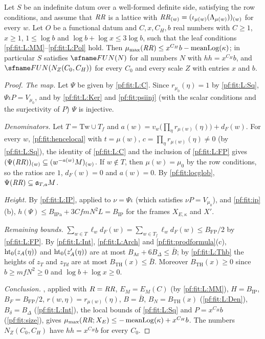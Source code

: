 \begin{theorem}\label{pf:fit:flb}
Let $S$ be an indefinite datum over a well-formed definite side, satisfying the row conditions, and assume that
$\mathit{RR}$ is a lattice with $\mathit{RR}_{(w)}=(\iota_{\mu(w)}(\Lambda_{\mu(w)}))_{(w)}$ for every $w$. Let $O$ be a
functional datum and $C,x,C_H,b$ real numbers with $C\ge1$, $x\ge1$, $1\le\log b$ and $\log b+\log x\le3\log b$, such
that the leaf conditions \ref{pf:fit:L:MM}--\ref{pf:fit:L:Pol} hold. Then $\mu_{\max}(\mathit{RR})\le x^{C_H}b-\operatorname{meanLog}(\kappa)$;
in particular $S$ satisfies $\fitFUN(N)$ for all numbers $N$ with $hh=x^{C_H}b$, and $\fitFUN(N_Z(C_0,C_H))$ for every
$C_0$ and every scale $Z$ with entries $x$ and $b$.
\end{theorem}

\begin{proof}
\emph{The map.} Let $\Psi$ be given by \ref{pf:fit:L:C}. Since $r_{\mu_0}(\eta)=1$ by \ref{pf:fit:L:Sq},
$\Psi\iota P=V_{\mu_0}$, and by \ref{pf:fit:L:Ker} and \cref{pf:fit:psiinj} (with the scalar conditions and the
surjectivity of $P$) $\Psi$ is injective.

\emph{Denominators.} Let $T=\mathrm{Tw}\cup T_f$ and $a(w)=v_w\bigl(\prod_\eta r_{\mu(w)}(\eta)\bigr)+d_F(w)$. For every
$w$, \cref{pf:fit:hencelocal} with $t=\mu(w)$, $c=\prod_\eta r_{\mu(w)}(\eta)\ne0$ (by \ref{pf:fit:L:Sq}), the
identity of \ref{pf:fit:L:C} and the inclusion of \ref{pf:fit:L:FP} gives $(\Psi(\mathit{RR}))_{(w)}\subseteq
(w^{-a(w)}M)_{(w)}$. If $w\notin T$, then $\mu(w)=\mu_0$ by the row conditions, so the ratios are $1$, $d_F(w)=0$ and
$a(w)=0$. By \cref{pf:fit:locglob}, $\Psi(\mathit{RR})\subseteq\mathfrak{a}_{T,a}M$.

\emph{Height.} By \ref{pf:fit:L:IP}, applied to $\nu=\Psi\iota$ (which satisfies $\nu P=V_{\mu_0}$), and
\cref{pf:fit:ip}(b), $h(\Psi)\le B_{\mathrm{IPa}}+3CfmN^2L=B_{\mathrm{IP}}$ for the frames $X_{E,\kappa}$ and $X'$.

\emph{Remaining bounds.} $\sum_{w\in T}\ell_wd_F(w)=\sum_{w\in T_f}\ell_wd_F(w)\le B_{\mathrm{FP}}/2$ by \ref{pf:fit:L:FP}.
By \ref{pf:fit:L:Int}, \ref{pf:fit:L:Arch} and \cref{pf:fit:prodformula}(c), $\operatorname{ht}_0(z_A(\eta))$ and
$\operatorname{ht}_0(z'_A(\eta))$ are at most $B_{\mathrm{Ar}}+6B_\Delta\le\bar B$; by \ref{pf:fit:L:Thb} the heights of $z_T$ and
$z_{Td}$ are at most $B_{\mathrm{TH}}(x)\le\bar B$. Moreover $B_{\mathrm{TH}}(x)\ge0$ since $b\ge mfN^2\ge0$ and
$\log b+\log x\ge0$.

\emph{Conclusion.} , applied with $R=\mathit{RR}$, $E_M=E_M(C)$ (by \ref{pf:fit:L:MM}),
$H=B_{\mathrm{IP}}$, $B_F=B_{\mathrm{FP}}/2$, $r(w,\eta)=r_{\mu(w)}(\eta)$, $B=\bar B$, $B_N=B_{\mathrm{TH}}(x)$
(\ref{pf:fit:L:Den}), $B_\delta=B_\Delta$ (\ref{pf:fit:L:Int}), the local bounds of \ref{pf:fit:L:Sq} and
$P=x^{C_H}b$ (\cref{pf:fit:size}), gives $\mu_{\max}(\mathit{RR};X_E)\le-\operatorname{meanLog}(\kappa)+x^{C_H}b$. The numbers
$N_Z(C_0,C_H)$ have $hh=x^{C_H}b$ for every $C_0$.
\end{proof}

